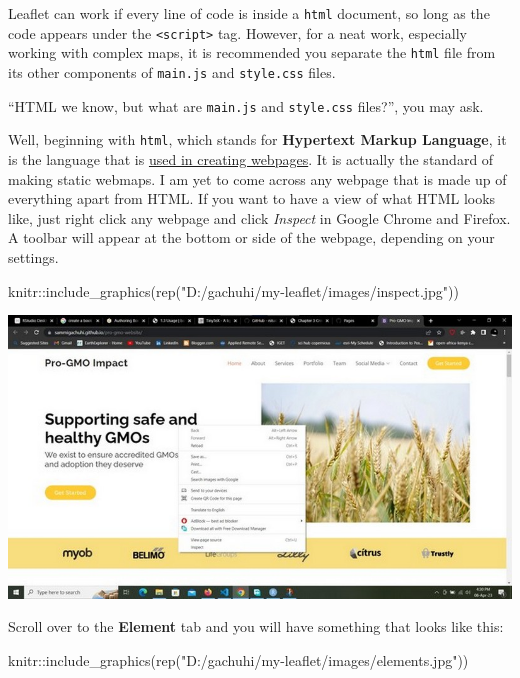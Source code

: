 \documentclass[
]{book}
\newenvironment{Shaded}{\begin{snugshade}}{\end{snugshade}}
\newcommand{\FunctionTok}[1]{\textcolor[rgb]{0.00,0.00,0.00}{#1}}
\newcommand{\NormalTok}[1]{#1}
\newcommand{\SpecialCharTok}[1]{\textcolor[rgb]{0.00,0.00,0.00}{#1}}
\newcommand{\StringTok}[1]{\textcolor[rgb]{0.31,0.60,0.02}{#1}}
\begin{document}
Leaflet can work if every line of code is inside a \texttt{html} document, so long as the code appears under the \texttt{\textless{}script\textgreater{}} tag. However, for a neat work, especially working with complex maps, it is recommended you separate the \texttt{html} file from its other components of \texttt{main.js} and \texttt{style.css} files.

``HTML we know, but what are \texttt{main.js} and \texttt{style.css} files?'', you may ask.

Well, beginning with \texttt{html}, which stands for \textbf{Hypertext Markup Language}, it is the language that is \href{https://www.tutorialspoint.com/html/index.htm}{used in creating webpages}. It is actually the standard of making static webmaps. I am yet to come across any webpage that is made up of everything apart from HTML. If you want to have a view of what HTML looks like, just right click any webpage and click \emph{Inspect} in Google Chrome and Firefox. A toolbar will appear at the bottom or side of the webpage, depending on your settings.

\begin{Shaded}
\begin{Highlighting}[]
\NormalTok{knitr}\SpecialCharTok{::}\FunctionTok{include\_graphics}\NormalTok{(}\FunctionTok{rep}\NormalTok{(}\StringTok{"D:/gachuhi/my{-}leaflet/images/inspect.jpg"}\NormalTok{))}
\end{Highlighting}
\end{Shaded}

\includegraphics[width=11.11in]{../images/inspect}

Scroll over to the \textbf{Element} tab and you will have something that looks like this:

\begin{Shaded}
\begin{Highlighting}[]
\NormalTok{knitr}\SpecialCharTok{::}\FunctionTok{include\_graphics}\NormalTok{(}\FunctionTok{rep}\NormalTok{(}\StringTok{"D:/gachuhi/my{-}leaflet/images/elements.jpg"}\NormalTok{))}
\end{Highlighting}
\end{Shaded}
\end{document}
